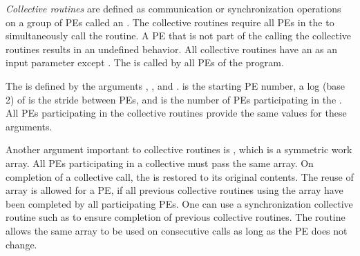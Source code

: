 
\emph{Collective routines} are defined as communication or synchronization operations 
on a group of \acp{PE} called an \activeset{}. The collective routines require all
\acp{PE} in the \activeset{} to simultaneously call the routine. 
A \ac{PE} that is not part of the \activeset{} calling the collective 
routines results in an undefined behavior.  All
collective routines have an \activeset{} as an input parameter except
\barrierall{}. The \barrierall{} is called by all \acp{PE} of the \openshmem{} program. 

The \activeset{} is defined by the arguments , , 
and .   is the starting \ac{PE} number, a log (base
2) of  is the stride between \acp{PE}, and  is
the number of \acp{PE} participating in the \activeset{}.  All \acp{PE} participating in the 
collective routines provide the same values for these arguments. 
 
Another argument important to collective routines is , which is a
symmetric work array.  All \acp{PE} participating in a collective must pass the same
 array.  On completion of a collective call, the  is restored to its 
original contents.  The reuse of  array is allowed for a \ac{PE}, if
all previous collective routines using the  array have been completed by all participating 
\acp{PE}.  One can use a synchronization collective routine such as \barrier{}
to ensure completion of previous collective routines. The  routine allows the same  array to be used on consecutive calls as long as the \ac{PE} \activeset{} does not change. 

%


